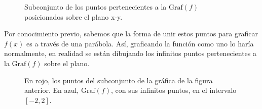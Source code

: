 \begin{example}
\begin{figure}[H]
\begin{center}
        \end{center}
        \caption{Subconjunto de los puntos pertenecientes a la $\text{Graf}(f)$ posicionados sobre el plano x-y.}
    \end{figure}
    Por conocimiento previo, sabemos que la forma de unir estos puntos para graficar $f(x)$ es a través de una parábola. Así, 
    graficando la función como uno lo haría normalmente, en realidad
    se están dibujando los infinitos puntos pertenecientes
    a la $\text{Graf}(f)$ sobre el plano.
        \begin{figure}[H] 
            \begin{center}
                \end{center}
            \caption{En rojo, los puntos del subconjunto de la gráfica de la figura anterior. En azul, $\text{Graf}(f)$, con sus infinitos puntos, en el intervalo $[-2,2]$.}
        \end{figure}
\end{example}
